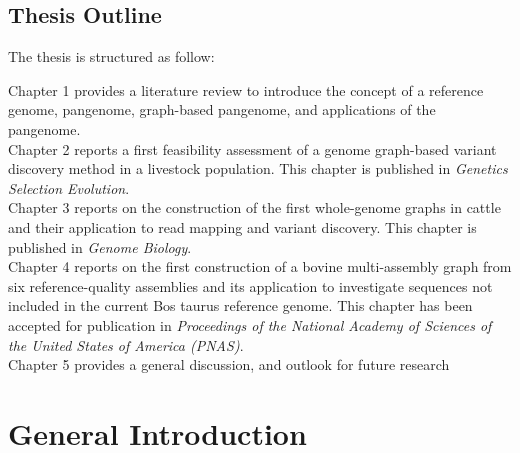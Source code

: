 \documentclass[11 pt, a4paper, notitlepage, twoside]{report}
\begin{document}
\newpage

{}
\section*{\LARGE{Thesis Outline}}
\thispagestyle{plain}

The thesis is structured as follow:

Chapter 1 provides a literature review to introduce the concept of a reference genome, pangenome, graph-based pangenome, and applications of the pangenome. \\


Chapter 2 reports a first feasibility assessment of a genome graph-based variant discovery method in a livestock population. This chapter is published in \emph{Genetics Selection Evolution}. \\ 


Chapter 3 reports on the construction of the first  whole-genome graphs in cattle and their application to read mapping and variant discovery. This chapter is published in \emph{Genome Biology}. \\


Chapter 4 reports on the first construction of a bovine multi-assembly graph from six reference-quality assemblies and its application to investigate sequences not included in the current Bos taurus reference genome. This chapter has been accepted for publication in \emph{Proceedings of the National Academy of Sciences of the United States of America (PNAS)}. \\


Chapter 5 provides a general discussion, and outlook for future research


\iftwoside
\cleardoublepage
\newpage
\fi

\newpage



\pagestyle{main}



\onehalfspacing




\chapter[General Introduction]{\LARGE{General Introduction}}
\label{chap:intro}

\bigskip


\end{document}
